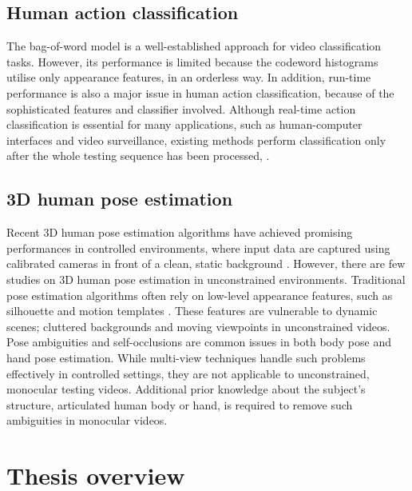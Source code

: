 \subsection{Human action classification}


The bag-of-word model is a well-established approach for video classification tasks. However, its performance is limited because the codeword histograms utilise only appearance features, in an orderless way. In addition, run-time performance is also a major issue in human action classification, because of the sophisticated features and classifier involved. Although real-time action classification is essential for many applications, such as human-computer interfaces and video surveillance, existing methods perform classification only after the whole testing sequence has been processed, \eg \cite{Schuldt2004, Dollar2005, Riemenschneider2009, Niebles2008, Wong2007}. 

\subsection{3D human pose estimation} 


Recent 3D human pose estimation algorithms have achieved promising performances in controlled environments, where input data are captured using calibrated cameras in front of a clean, static background \cite{Rogez2012, Pons-Moll2011, Sigal2012}. 
However, there are few studies on 3D human pose estimation in unconstrained environments.  
Traditional pose estimation algorithms often rely on low-level appearance features, such as silhouette and motion templates \cite{Bissacco2007, Rogez2012, Ionescu2011, Navaratnam2006}. These features are vulnerable to dynamic scenes; cluttered backgrounds and moving viewpoints in unconstrained videos. 
Pose ambiguities and self-occlusions are common issues in both body pose and hand pose estimation. While multi-view techniques handle such problems effectively in controlled settings, they are not applicable to unconstrained, monocular testing videos. Additional prior knowledge about the subject's structure, \eg articulated human body or hand, is required to remove such ambiguities in monocular videos. 

\section{Thesis overview}

